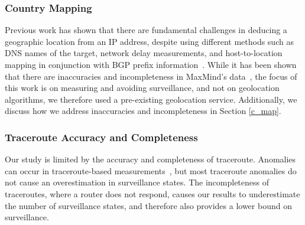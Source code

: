 \subsubsection{Country Mapping}
Previous work has shown that there are fundamental challenges in deducing a geographic location from an IP address, despite using different methods such as DNS names of the target, network delay measurements, and host-to-location mapping in conjunction with BGP prefix information~\cite{padmanabhan2001investigation}.  While it has been shown that there are inaccuracies and incompleteness in MaxMind's data~\cite{huffaker2011geocompare}, the focus of this work is on measuring and avoiding surveillance, and not on geolocation algorithms, we therefore used a pre-existing geolocation service. Additionally, we discuss how we address inaccuracies and incompleteness in Section \ref{c_map}.

\subsubsection{Traceroute Accuracy and Completeness}
Our study is limited by the accuracy and completeness of traceroute.  Anomalies can occur in traceroute-based measurements~\cite{augustin2006avoiding}, but most traceroute anomalies do not cause an overestimation in surveillance states.  The incompleteness of traceroutes, where a router does not respond, causes our results to underestimate the number of surveillance states, and therefore also provides a lower bound on surveillance.
